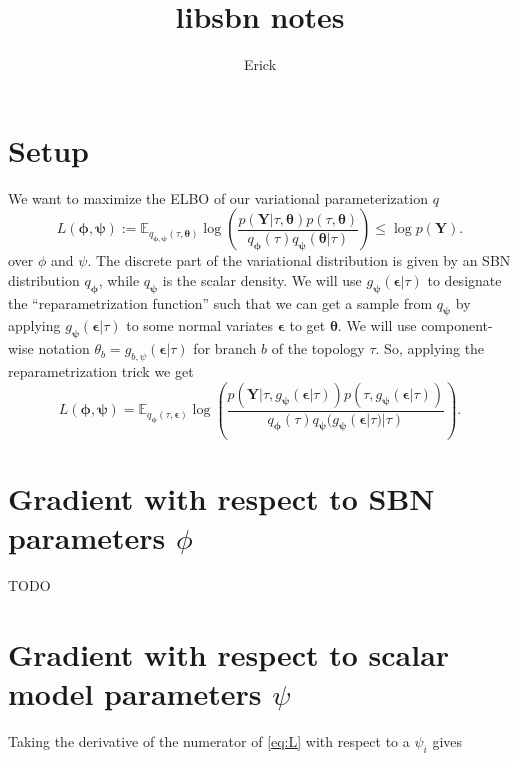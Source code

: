 \documentclass{article}
\title{libsbn notes}
\author{Erick}
\begin{document}


\section*{Setup}
We want to maximize the ELBO of our variational parameterization $q$
\[
L(\bm{\phi},{\bm{\psi}}) := \mathbb{E}_{q_{\bm{\phi},{\bm{\psi}}}(\tau, \bm{\theta})}\log\left(\frac{p(\bm{Y}|\tau, \bm{\theta}) p(\tau, \bm{\theta})}{q_{\bm{\phi}}(\tau)q_{\bm{\psi}}(\bm{\theta}|\tau)}\right) \leq \log p(\bm{Y}).
\]
over $\phi$ and $\psi$.
The discrete part of the variational distribution is given by an SBN distribution $q_\bm\phi$, while $q_\bm\psi$ is the scalar density.
We will use $g_{\bm{\psi}}(\bm{\epsilon}|\tau)$ to designate the ``reparametrization function'' such that we can get a sample from $q_\bm\psi$ by applying $g_{\bm{\psi}}(\bm{\epsilon}|\tau)$ to some normal variates $\bm\epsilon$ to get $\bm\theta$.
We will use component-wise notation $\theta_b = g_{b, \psi}(\bm\epsilon|\tau)$ for branch $b$ of the topology $\tau$.
So, applying the reparametrization trick we get
\begin{equation}
L(\bm{\phi},{\bm{\psi}}) = \mathbb{E}_{
    q_{\bm{\phi}}(\tau,\bm{\epsilon})}
    \log\left(
        \frac
        {p(\bm{Y}|\tau,g_{\bm{\psi}}(\bm{\epsilon}|\tau))p(\tau, g_{\bm{\psi}}(\bm{\epsilon}|\tau))}
        {q_{\bm{\phi}}(\tau)q_{\bm{\psi}}(g_{\bm{\psi}}(\bm{\epsilon}|\tau)|\tau)}
    \right).
\label{eq:L}
\end{equation}

\section*{Gradient with respect to SBN parameters $\phi$}

TODO

\section*{Gradient with respect to scalar model parameters $\psi$}

Taking the derivative of the numerator of \eqref{eq:L} with respect to a $\psi_i$ gives
\end{document}
